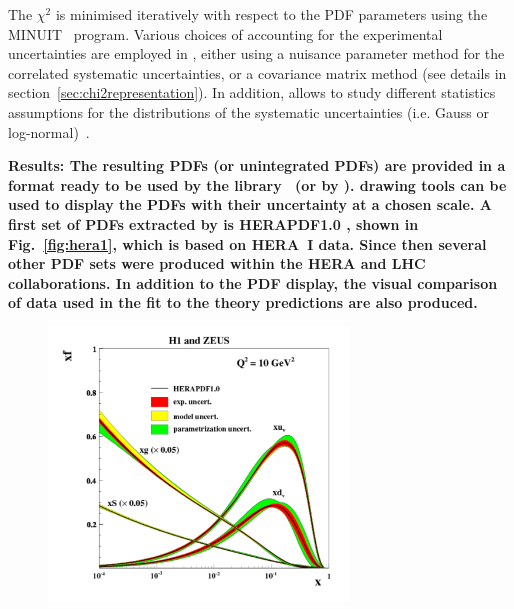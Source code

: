 \begin{description}
The $\chi^2$ is  minimised iteratively 
with respect to the PDF parameters using the MINUIT~\cite{minuit} program.
Various choices of accounting for the experimental uncertainties are employed in \fitter, either using 
a nuisance parameter method for the correlated systematic uncertainties, 
or a covariance matrix method (see details in section~\ref{sec:chi2representation}). In addition, \fitter allows to study different statistics 
assumptions for the distributions of the systematic uncertainties (i.e. Gauss or log-normal)~\cite{hera-lhc:report2009}.
%
%
\item
\bf{Results:} \rm 
The resulting PDFs (or unintegrated PDFs) are provided in a format ready to be used by the \lhapdf 
library~\cite{lhapdf,lhapdfweb} (or by \tmdlib \cite{tmdlref}).
\fitter drawing tools can be used to display the PDFs with their uncertainty at a chosen scale.  
A first set of PDFs extracted by \fitter is HERAPDF1.0 \cite{h1zeus:2009wt}, shown in Fig.~\ref{fig:hera1}, 
which is based on HERA~I data.
Since then several other PDF sets were produced within the HERA and LHC collaborations.
In addition to the PDF display, 
the visual comparison of data used in the fit to the theory predictions are also produced. 
\begin{figure}[!ht]
   \centering
   \includegraphics[width=8cm]{hera1.pdf}

\end{figure}
\end{description}
